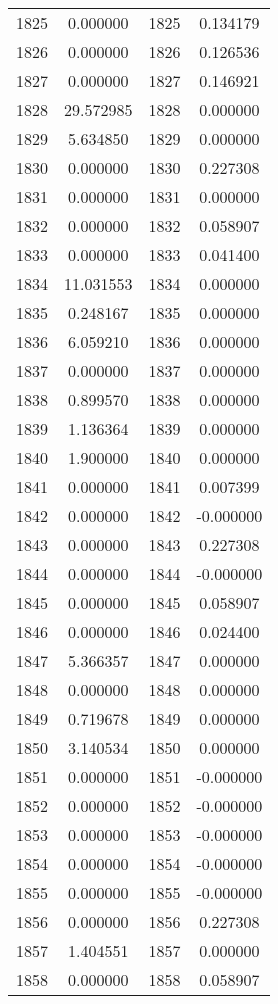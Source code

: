 \documentclass[12pt]{article}
\begin{document}
\begin{longtable}{@{}cccc@{}}
1825 & 0.000000 & 1825 & 0.134179 \\
1826 & 0.000000 & 1826 & 0.126536 \\
1827 & 0.000000 & 1827 & 0.146921 \\
1828 & 29.572985 & 1828 & 0.000000 \\
1829 & 5.634850 & 1829 & 0.000000 \\
1830 & 0.000000 & 1830 & 0.227308 \\
1831 & 0.000000 & 1831 & 0.000000 \\
1832 & 0.000000 & 1832 & 0.058907 \\
1833 & 0.000000 & 1833 & 0.041400 \\
1834 & 11.031553 & 1834 & 0.000000 \\
1835 & 0.248167 & 1835 & 0.000000 \\
1836 & 6.059210 & 1836 & 0.000000 \\
1837 & 0.000000 & 1837 & 0.000000 \\
1838 & 0.899570 & 1838 & 0.000000 \\
1839 & 1.136364 & 1839 & 0.000000 \\
1840 & 1.900000 & 1840 & 0.000000 \\
1841 & 0.000000 & 1841 & 0.007399 \\
1842 & 0.000000 & 1842 & -0.000000 \\
1843 & 0.000000 & 1843 & 0.227308 \\
1844 & 0.000000 & 1844 & -0.000000 \\
1845 & 0.000000 & 1845 & 0.058907 \\
1846 & 0.000000 & 1846 & 0.024400 \\
1847 & 5.366357 & 1847 & 0.000000 \\
1848 & 0.000000 & 1848 & 0.000000 \\
1849 & 0.719678 & 1849 & 0.000000 \\
1850 & 3.140534 & 1850 & 0.000000 \\
1851 & 0.000000 & 1851 & -0.000000 \\
1852 & 0.000000 & 1852 & -0.000000 \\
1853 & 0.000000 & 1853 & -0.000000 \\
1854 & 0.000000 & 1854 & -0.000000 \\
1855 & 0.000000 & 1855 & -0.000000 \\
1856 & 0.000000 & 1856 & 0.227308 \\
1857 & 1.404551 & 1857 & 0.000000 \\
1858 & 0.000000 & 1858 & 0.058907 \\

\end{longtable}
\end{document}
